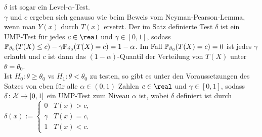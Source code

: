 \begin{Bem}
    $\delta$ ist sogar ein Level-$\alpha$-Test.\\
    $\gamma$ und $c$ ergeben sich genauso wie beim Beweis vom Neyman-Pearson-Lemma,
    wenn man $Y(x)$ durch $T(x)$ ersetzt.
    Der im Satz definierte Test $\delta$ ist ein UMP-Test für jedes
    $c \in \real$ und $\gamma \in [0, 1]$, sodass
    $\mathbb{P}_{\vartheta_0}(T(X) \le c) - \gamma  \mathbb{P}_{\vartheta_0}(T(X) = c) = 1 - \alpha$.
    Im Fall $\mathbb{P}_{\vartheta_0}(T(X) = c) = 0$ ist jedes $\gamma$ erlaubt und $c$ ist
    dann das $(1 - \alpha)$-Quantil der Verteilung von $T(X)$ unter $\theta = \theta_0$.\\
    Ist $H_0\colon \theta \ge \theta_0$ vs $H_1\colon \theta < \theta_0$ zu testen,
    so gibt es unter den Voraussetzungen des Satzes von eben
    für alle $\alpha \in (0, 1)$ Zahlen $c \in \real$ und $\gamma \in [0, 1]$,
    sodass $\delta\colon \mathcal{X} \rightarrow [0, 1]$ ein UMP-Test zum Niveau $\alpha$ ist, wobei
    $\delta$ definiert ist durch
    $\delta(x) :=  \begin{cases}0 & T(x) > c,\\
    \gamma & T(x) = c,\\1 & T(x) < c.\end{cases}$
\end{Bem}

\vspace{3mm}
\linie
\pagebreak

